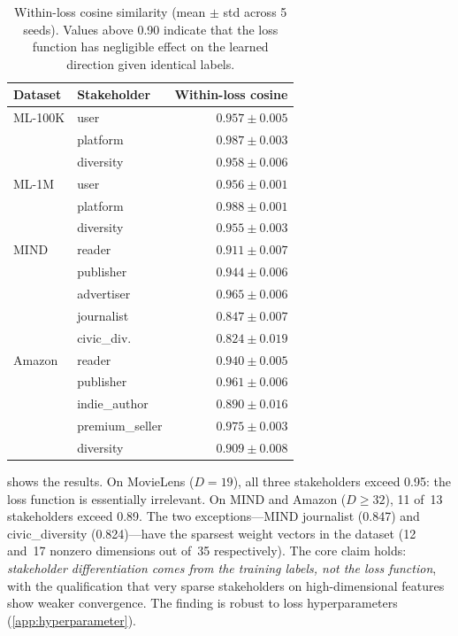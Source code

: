 \documentclass[11pt,letterpaper]{article}
\begin{document}
\begin{table}[t]
  \caption{Within-loss cosine similarity (mean $\pm$ std across 5
    seeds). Values above 0.90 indicate that the loss function has
    negligible effect on the learned direction given identical labels.}
  \label{tab:within_loss}
  \centering\small
  \begin{tabular}{llr}
    \toprule
    \textbf{Dataset} & \textbf{Stakeholder} &
      \textbf{Within-loss cosine} \\
    \midrule
    ML-100K & user      & $0.957 \pm 0.005$ \\
            & platform  & $0.987 \pm 0.003$ \\
            & diversity & $0.958 \pm 0.006$ \\
    \midrule
    ML-1M   & user      & $0.956 \pm 0.001$ \\
            & platform  & $0.988 \pm 0.001$ \\
            & diversity & $0.955 \pm 0.003$ \\
    \midrule
    MIND    & reader      & $0.911 \pm 0.007$ \\
            & publisher   & $0.944 \pm 0.006$ \\
            & advertiser  & $0.965 \pm 0.006$ \\
            & journalist  & $0.847 \pm 0.007$ \\
            & civic\_div. & $0.824 \pm 0.019$ \\
    \midrule
    Amazon  & reader          & $0.940 \pm 0.005$ \\
            & publisher       & $0.961 \pm 0.006$ \\
            & indie\_author   & $0.890 \pm 0.016$ \\
            & premium\_seller & $0.975 \pm 0.003$ \\
            & diversity       & $0.909 \pm 0.008$ \\
    \bottomrule
  \end{tabular}
\end{table}

 shows the results. On MovieLens ($D{=}19$),
all three stakeholders exceed 0.95: the loss function is
essentially irrelevant. On MIND and Amazon ($D \geq 32$), 11 of~13
stakeholders exceed 0.89. The two exceptions---MIND journalist
(0.847) and civic\_diversity (0.824)---have the sparsest weight
vectors in the dataset (12 and~17 nonzero dimensions out of~35
respectively). The core claim holds: \emph{stakeholder
differentiation comes from the training labels, not the loss
function}, with the qualification that very sparse stakeholders on
high-dimensional features show weaker convergence. The finding is
robust to loss hyperparameters (\cref{app:hyperparameter}).
\end{document}
